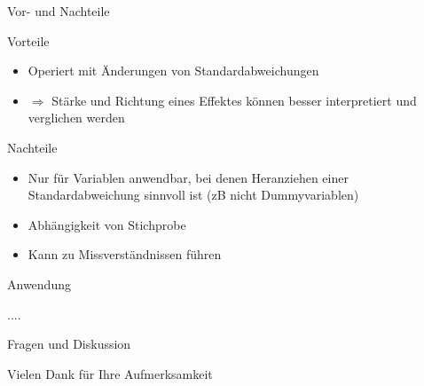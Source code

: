 \documentclass[10pt]{beamer}
\begin{document}
\begin{frame}{Vor- und Nachteile}
	
	\begin{Large}{Vorteile}\end{Large}
	
	\begin{itemize}
		\item Operiert mit Änderungen von Standardabweichungen
		\item $\Rightarrow$ Stärke und Richtung eines Effektes können besser interpretiert und verglichen werden
	\end{itemize}
	
	\begin{Large}{Nachteile}\end{Large}
	
	  \begin{itemize}
		\item Nur für Variablen anwendbar, bei denen Heranziehen einer Standardabweichung sinnvoll ist (zB nicht Dummyvariablen)
		\item Abhängigkeit von Stichprobe
		\item Kann zu Missverständnissen führen
	  \end{itemize}
	
\end{frame}

\begin{frame}{Anwendung}
	
	....
	
\end{frame}	

\begin{frame}{Fragen und Diskussion}
	\begin{LARGE}
		\begin{center}
			Vielen Dank für Ihre Aufmerksamkeit
		\end{center}
	\end{LARGE}
\end{frame}
\end{document}
